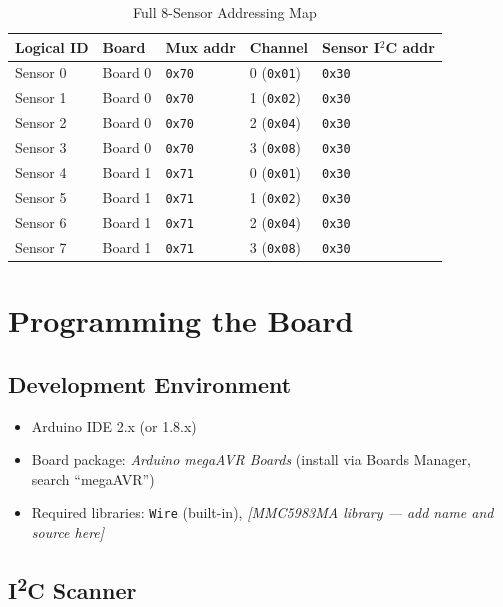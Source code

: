 \documentclass[12pt]{article}
\begin{document}
\begin{table}[H]
  \centering
  \caption{Full 8-Sensor Addressing Map}
  \begin{tabular}{lllll}
    \toprule
    \textbf{Logical ID} & \textbf{Board} & \textbf{Mux addr} &
    \textbf{Channel} & \textbf{Sensor I$^2$C addr} \\
    \midrule
    Sensor 0 & Board 0 & \texttt{0x70} & 0 (\texttt{0x01}) & \texttt{0x30} \\
    Sensor 1 & Board 0 & \texttt{0x70} & 1 (\texttt{0x02}) & \texttt{0x30} \\
    Sensor 2 & Board 0 & \texttt{0x70} & 2 (\texttt{0x04}) & \texttt{0x30} \\
    Sensor 3 & Board 0 & \texttt{0x70} & 3 (\texttt{0x08}) & \texttt{0x30} \\
    Sensor 4 & Board 1 & \texttt{0x71} & 0 (\texttt{0x01}) & \texttt{0x30} \\
    Sensor 5 & Board 1 & \texttt{0x71} & 1 (\texttt{0x02}) & \texttt{0x30} \\
    Sensor 6 & Board 1 & \texttt{0x71} & 2 (\texttt{0x04}) & \texttt{0x30} \\
    Sensor 7 & Board 1 & \texttt{0x71} & 3 (\texttt{0x08}) & \texttt{0x30} \\
    \bottomrule
  \end{tabular}
  \label{tab:sensor_map}
\end{table}

\newpage
\section{Programming the Board}

\subsection{Development Environment}

\begin{itemize}
  \item Arduino IDE 2.x (or 1.8.x)
  \item Board package: \textit{Arduino megaAVR Boards} (install via
        Boards Manager, search ``megaAVR'')
  \item Required libraries: \texttt{Wire} (built-in),
        \textit{[MMC5983MA library --- add name and source here]}
\end{itemize}

\subsection{I\textsuperscript{2}C Scanner}
\label{sec:i2c_scan}
\end{document}
